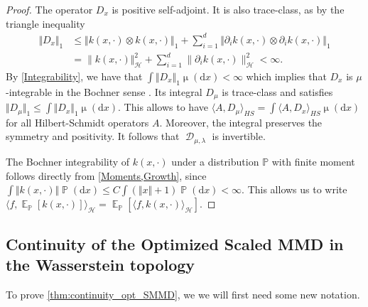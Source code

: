 \documentclass{article}
\newcommand{\ud}{\mathrm d}
\newcommand{\dx}{\ud x}
\newcommand{\mudx}{\operatorname{\mu}(\dx)}
\DeclareMathOperator{\D}{\mathcal D}
\DeclareMathOperator{\E}{\mathbb E}
\newcommand{\h}{\mathcal H}
\newcommand{\PP}{\mathbb P}
\begin{document}
\begin{proof}
The operator $D_{x}$ is positive self-adjoint.
It is also trace-class,
as by the triangle inequality
\begin{align*}
  \Vert D_{x} \Vert_{1}
  &\le \Vert k(x, \cdot) \otimes k(x, \cdot)\Vert_{1}
     + \sum_{i=1}^{d} \Vert \partial_i k(x, \cdot) \otimes \partial_i k(x, \cdot) \Vert_{1}
  \\
  &= \lVert k(x, \cdot) \Vert_{\h}^{2}
   + \sum_{i=1}^{d} \lVert \partial_i k(x, \cdot) \rVert_{\h}^{2}
   <\infty
.\end{align*}
By \cref{Integrability},
we have that $\int \Vert D_{x}\Vert_1\mudx<\infty$
which implies that $D_{x}$ is $\mu$-integrable in the Bochner sense
\parencite[Definition 1 and Theorem 2]{Retherford:1978}. Its integral $D_\mu$ is trace-class and satisfies
$\Vert D_\mu\Vert_{1}\le\int\Vert D_{x}\Vert_{1} \mudx$.  This allows to have $\langle A,D_\mu \rangle_{HS} = \int \langle A, D_x \rangle_{HS} \mudx$ for all Hilbert-Schmidt operators $A$. Moreover, the integral preserves the symmetry and positivity. It follows that $\D_{\mu,\lambda}$ is invertible.

The Bochner integrability of $k(x,\cdot)$ under a distribution $\PP$ with finite moment follows directly from \cref{Moments,Growth}, since $ \int \Vert k(x, \cdot)\Vert \operatorname{\PP}(\dx)  \leq C\int (\Vert x\Vert+1) \operatorname{\PP}(\dx) < \infty$. This allows us to write $ \langle f, \E_{\PP}[k(x, \cdot)]\rangle_{\h} = \E_{\PP}[\langle f, k(x, \cdot) \rangle_{\h}] $.
\end{proof}


\subsection{Continuity of the Optimized Scaled MMD in the Wasserstein topology}\label{appendix:continuity_opt_smmd}
To prove \cref{thm:continuity_opt_SMMD},
we we will first need some new notation.
\end{document}
